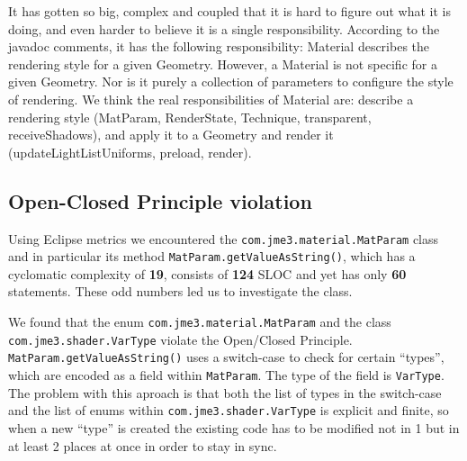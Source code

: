 \documentclass[a4paper, 10pt]{article}
\begin{document}
It has gotten so big, complex and coupled that it is hard to 
figure out what it is doing, and even harder to believe
it is a single responsibility.
According to the javadoc comments, 
it has the following responsibility:
Material describes the rendering style for a given Geometry.
However, a Material is not specific for a given Geometry.
Nor is it purely a collection of parameters to configure
the style of rendering.
We think the real responsibilities of Material are:
describe a rendering style 
(MatParam, RenderState, Technique, transparent, receiveShadows),
and apply it to a Geometry and render it
(updateLightListUniforms, preload, render).

\subsection{Open-Closed Principle violation}%
\label{sec:lsp_violation} %

Using Eclipse metrics we encountered the
\verb|com.jme3.material.MatParam| class and in particular its method
\verb|MatParam.getValueAsString()|, which has a cyclomatic complexity
of \textbf{19}, consists of \textbf{124} SLOC and yet has only
\textbf{60} statements. These odd numbers led us to investigate the
class.

We found that the enum \verb|com.jme3.material.MatParam| and the class\\
\verb|com.jme3.shader.VarType| violate the Open/Closed Principle.\\
\verb|MatParam.getValueAsString()| uses a switch-case to check for
certain ``types'', which are encoded as a field within
\verb|MatParam|. The type of the field is \verb|VarType|. The problem
with this aproach is that both the list of types in the switch-case
and the list of enums within \verb|com.jme3.shader.VarType| is
explicit and finite, so when a new ``type'' is created the existing
code has to be modified not in 1 but in at least 2 places at once in
order to stay in sync.

\end{document}

